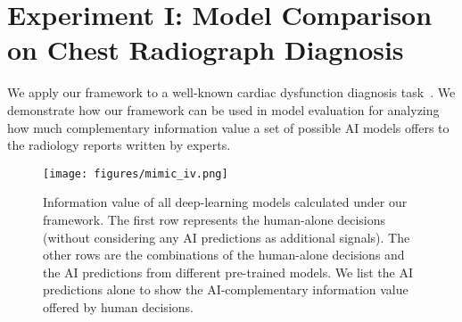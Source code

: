  \mvspace{-2mm}
\section{Experiment I: Model Comparison on Chest Radiograph Diagnosis}
\label{exp2}
 \mvspace{-2mm}
We apply our framework to a well-known cardiac dysfunction diagnosis task~\citep{rajpurkar2018deep, tang2020automated, shreekumar2025x}.
We demonstrate how our framework can be used in model evaluation for analyzing how much complementary information value a set of possible AI models offers to the radiology reports written by experts.


\begin{figure}
    \centering
    \texttt{[image: figures/mimic\_iv.png]}
    \mvspace{-4mm}
    \caption{Information value of all deep-learning models calculated under our framework. The first row represents the human-alone decisions (without considering any AI predictions as additional signals). The other rows are the combinations of the human-alone decisions and the AI predictions from different pre-trained models. We list the AI predictions alone to show the AI-complementary information value offered by human decisions.}
    \mvspace{-6mm}
    \label{fig:mimic-iv-analysis}
\end{figure}
 \mvspace{-2mm}
